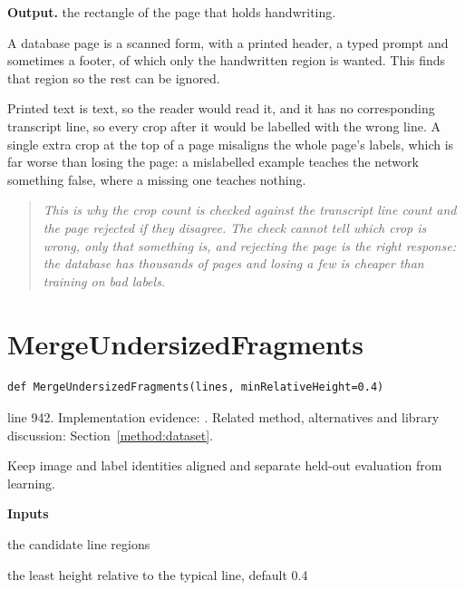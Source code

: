 \noindent\textbf{Output.} the rectangle of the page that holds handwriting.


A database page is a scanned form, with a printed header, a typed prompt and sometimes a footer, of which only the handwritten region is wanted. This finds that region so the rest can be ignored.


Printed text is text, so the reader would read it, and it has no corresponding transcript line, so every crop after it would be labelled with the wrong line. A single extra crop at the top of a page misaligns the whole page's labels, which is far worse than losing the page: a mislabelled example teaches the network something false, where a missing one teaches nothing.


\begin{quote}\small\itshape This is why the crop count is checked against the transcript line count and the page rejected if they disagree. The check cannot tell which crop is wrong, only that something is, and rejecting the page is the right response: the database has thousands of pages and losing a few is cheaper than training on bad labels.\end{quote}


\section{MergeUndersizedFragments}\label{fn:train:MergeUndersizedFragments}
\begin{lstlisting}[style=sig]
def MergeUndersizedFragments(lines, minRelativeHeight=0.4)
\end{lstlisting}
 line 942. Implementation evidence: \cite{code2026}. Related method, alternatives and library discussion: Section~\ref{method:dataset}.


Keep image and label identities aligned and separate held-out evaluation from learning.




\noindent\textbf{Inputs}
\begin{description}[leftmargin=2.2em,style=nextline,font=\normalfont\ttfamily]\setlength\itemsep{1pt}
  \item[{lines}] \normalfont the candidate line regions
  \item[{minRelativeHeight}] \normalfont the least height relative to the typical line, default 0.4
\end{description}

